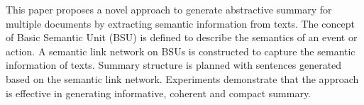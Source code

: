 This paper proposes a novel approach to generate abstractive summary for multiple documents by extracting semantic information from texts. The concept of Basic Semantic Unit (BSU) is defined to describe the semantics of an event or action. A semantic link network on BSUs is constructed to capture the semantic information of texts. Summary structure is planned with sentences generated based on the semantic link network. Experiments demonstrate that the approach is effective in generating informative, coherent and compact summary.
